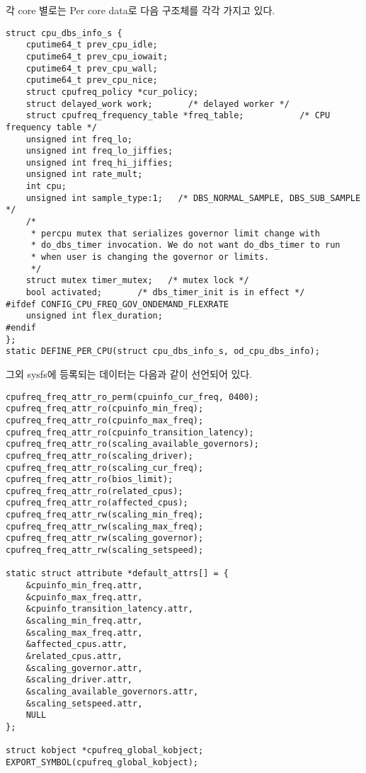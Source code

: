 \vspace{\baselineskip}

각 core 별로는 Per core data로 다음 구조체를 각각 가지고 있다. 
\begin{lstlisting}
struct cpu_dbs_info_s {
    cputime64_t prev_cpu_idle;
    cputime64_t prev_cpu_iowait;
    cputime64_t prev_cpu_wall;
    cputime64_t prev_cpu_nice;
    struct cpufreq_policy *cur_policy;      
    struct delayed_work work;       /* delayed worker */
    struct cpufreq_frequency_table *freq_table;           /* CPU frequency table */
    unsigned int freq_lo;
    unsigned int freq_lo_jiffies;
    unsigned int freq_hi_jiffies;
    unsigned int rate_mult;
    int cpu;
    unsigned int sample_type:1;   /* DBS_NORMAL_SAMPLE, DBS_SUB_SAMPLE */
    /*
     * percpu mutex that serializes governor limit change with
     * do_dbs_timer invocation. We do not want do_dbs_timer to run
     * when user is changing the governor or limits.
     */
    struct mutex timer_mutex;   /* mutex lock */
    bool activated;       /* dbs_timer_init is in effect */
#ifdef CONFIG_CPU_FREQ_GOV_ONDEMAND_FLEXRATE
    unsigned int flex_duration;
#endif
};
static DEFINE_PER_CPU(struct cpu_dbs_info_s, od_cpu_dbs_info);
\end{lstlisting}

\vspace{\baselineskip}

그외 sysfs에 등록되는 데이터는 다음과 같이 선언되어 있다. 
\begin{lstlisting}
cpufreq_freq_attr_ro_perm(cpuinfo_cur_freq, 0400);
cpufreq_freq_attr_ro(cpuinfo_min_freq);
cpufreq_freq_attr_ro(cpuinfo_max_freq);
cpufreq_freq_attr_ro(cpuinfo_transition_latency);
cpufreq_freq_attr_ro(scaling_available_governors);
cpufreq_freq_attr_ro(scaling_driver);
cpufreq_freq_attr_ro(scaling_cur_freq);
cpufreq_freq_attr_ro(bios_limit);
cpufreq_freq_attr_ro(related_cpus);
cpufreq_freq_attr_ro(affected_cpus);
cpufreq_freq_attr_rw(scaling_min_freq);
cpufreq_freq_attr_rw(scaling_max_freq);
cpufreq_freq_attr_rw(scaling_governor); 
cpufreq_freq_attr_rw(scaling_setspeed);

static struct attribute *default_attrs[] = {
    &cpuinfo_min_freq.attr,
    &cpuinfo_max_freq.attr,
    &cpuinfo_transition_latency.attr,
    &scaling_min_freq.attr,
    &scaling_max_freq.attr,
    &affected_cpus.attr,
    &related_cpus.attr,
    &scaling_governor.attr,
    &scaling_driver.attr,
    &scaling_available_governors.attr,
    &scaling_setspeed.attr,
    NULL
};

struct kobject *cpufreq_global_kobject;
EXPORT_SYMBOL(cpufreq_global_kobject);
\end{lstlisting}

